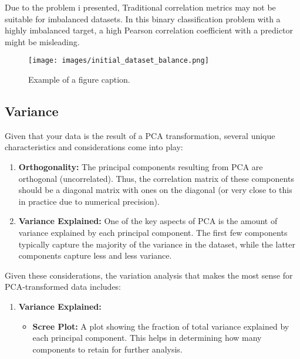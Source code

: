 Due to the problem i presented, Traditional correlation metrics may not be suitable for imbalanced datasets. In this binary classification problem with a highly imbalanced target, a high Pearson correlation coefficient with a predictor might be misleading.

\begin{figure}[htbp]
    \centerline{\texttt{[image: images/initial\_dataset\_balance.png]}}
    \caption{Example of a figure caption.}
    \label{initial_dataset_balance}
\end{figure}


\subsection{Variance}


Given that your data is the result of a PCA transformation, several unique characteristics and considerations come into play:

\begin{enumerate}
    \item \textbf{Orthogonality:} The principal components resulting from PCA are orthogonal (uncorrelated). Thus, the correlation matrix of these components should be a diagonal matrix with ones on the diagonal (or very close to this in practice due to numerical precision).

    \item \textbf{Variance Explained:} One of the key aspects of PCA is the amount of variance explained by each principal component. The first few components typically capture the majority of the variance in the dataset, while the latter components capture less and less variance.
\end{enumerate}

Given these considerations, the variation analysis that makes the most sense for PCA-transformed data includes:

\begin{enumerate}
    \item \textbf{Variance Explained:}
          \begin{itemize}
              \item \textbf{Scree Plot:} A plot showing the fraction of total variance explained by each principal component. This helps in determining how many components to retain for further analysis.
          \end{itemize}
\end{enumerate}

